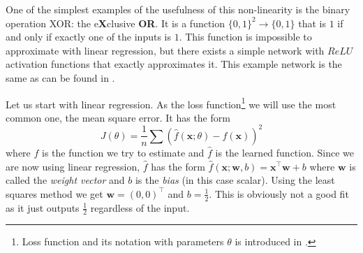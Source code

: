 One of the simplest examples of the usefulness of this non-linearity is the binary operation XOR: the e\textbf{X}clusive \textbf{OR}. It is a function $\{0,1\}^2\rightarrow \{0,1\}$ that is $1$ if and only if exactly one of the inputs is $1$. This function is impossible to approximate with linear regression, but there exists a simple network with $ReLU$ activation functions that exactly approximates it. This example network is the same as can be found in \cite{neural}.

Let us start with linear regression. As the loss function\footnote{Loss function and its notation with parameters $\theta$ is introduced in .} we will use the most common one, the mean square error. It has the form
$$J(\theta)=\frac{1}{n}\sum(\widehat{f}(\textbf{x};\theta)-f(\textbf{x}))^2$$
where $f$ is the function we try to estimate and $\widehat{f}$ is the learned function. Since we are now using linear regression, $\widehat{f}$ has the form $\widehat{f}(\textbf{x};\textbf{w},b)=\textbf{x}^\top \textbf{w}+b$ where $\textbf{w}$ is called the \textit{weight vector} and $b$ is the \textit{bias} (in this case scalar). Using the least squares method we get $\textbf{w}=(0,0)^\top$ and $b=\frac{1}{2}$. This is obviously not a good fit as it just outputs $\frac{1}{2}$ regardless of the input.

